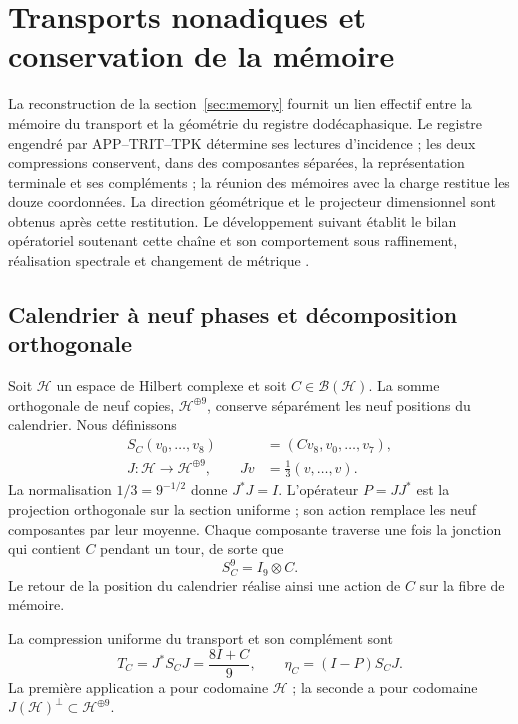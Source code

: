\section{Transports nonadiques et conservation de la mémoire}
\label{sec:nonadic}

La reconstruction de la section~\ref{sec:memory} fournit un lien effectif entre la mémoire du transport et la géométrie du registre dodécaphasique. Le registre engendré par APP--TRIT--TPK détermine ses lectures d'incidence ; les deux compressions conservent, dans des composantes séparées, la représentation terminale et ses compléments ; la réunion des mémoires avec la charge restitue les douze coordonnées. La direction géométrique et le projecteur dimensionnel sont obtenus après cette restitution. Le développement suivant établit le bilan opératoriel soutenant cette chaîne et son comportement sous raffinement, réalisation spectrale et changement de métrique \cite{HMT-VIII,hmtX}.

\subsection{Calendrier à neuf phases et décomposition orthogonale}

Soit \(\mathcal H\) un espace de Hilbert complexe et soit
\(C\in\mathcal B(\mathcal H)\). La somme orthogonale de neuf copies,
\(\mathcal H^{\oplus9}\), conserve séparément les neuf positions
du calendrier. Nous définissons
\begin{equation}
 \begin{split}
 S_C(v_0,\ldots,v_8)&=(Cv_8,v_0,\ldots,v_7),\\
 J:\mathcal H\longrightarrow\mathcal H^{\oplus9},
 \qquad Jv&=\frac13(v,\ldots,v).
 \end{split}
 \label{nt:calendar}
\end{equation}
La normalisation \(1/3=9^{-1/2}\) donne \(J^*J=I\). L'opérateur \(P=JJ^*\) est la projection orthogonale sur la section uniforme ; son action remplace les neuf composantes par leur moyenne. Chaque composante traverse une fois la jonction qui contient \(C\) pendant un tour, de sorte que
\begin{equation}
 S_C^9=I_9\otimes C.
 \label{nt:full-return}
\end{equation}
Le retour de la position du calendrier réalise ainsi une action de
\(C\) sur la fibre de mémoire.

\begin{definition}
La compression uniforme du transport et son complément sont
\begin{equation}
 T_C=J^*S_CJ=\frac{8I+C}{9},
 \qquad
 \eta_C=(I-P)S_CJ.
 \label{nt:compression}
\end{equation}
La première application a pour codomaine \(\mathcal H\) ; la seconde
a pour codomaine \(J(\mathcal H)^\perp\subset\mathcal H^{\oplus9}\).
\end{definition}

